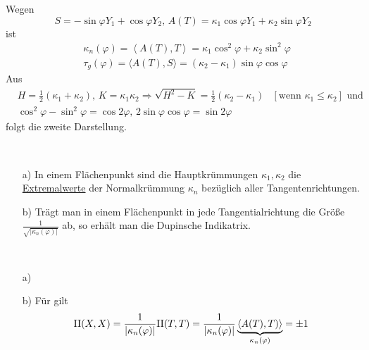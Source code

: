 \begin{beweis}
 Wegen
 \[
  S = - \sin \varphi Y_1 + \cos \varphi Y_2, \, A(T) = \kappa_1 \cos \varphi Y_1 + \kappa_2 \sin \varphi Y_2
 \]
 ist
 \begin{align*}
  &\kappa_n(\varphi) = \left\langle A(T), T \right\rangle = \kappa_1 \cos^2 \varphi + \kappa_2 \sin^2 \varphi \\
  &\tau_g(\varphi) = \langle A(T), S \rangle = (\kappa_2 - \kappa_1) \sin \varphi \cos \varphi
 \end{align*}
 Aus 
 \begin{align*}
  &H = \frac12 (\kappa_1 + \kappa_2), \, K = \kappa_1 \kappa_2 \Rightarrow \sqrt{H^2 - K} = \frac12 (\kappa_2 - \kappa_1) &[\text{wenn }\kappa_1 \le \kappa_2] \text{ und} \\
  & \cos^2 \varphi - \sin^2 \varphi = \cos 2\varphi, \, 2 \sin \varphi \cos \varphi = \sin 2 \varphi
 \end{align*}
 folgt die zweite Darstellung.
\end{beweis}

\begin{folgerung} \(\)
 \begin{enumerate}
  \item[a)] In einem Flächenpunkt sind die Hauptkrümmungen \(\kappa_1, \kappa_2\) die \uline{Extremalwerte} der Normalkrümmung \(\kappa_n\) bezüglich aller Tangentenrichtungen.
  \item[b)] Trägt man in einem Flächenpunkt in jede Tangentialrichtung die Größe \(\frac{1}{\sqrt{|\kappa_n(\varphi)|}}\) ab, so erhält man die Dupinsche Indikatrix.
 \end{enumerate}
\end{folgerung}

\begin{beweis} \(\)
 \begin{enumerate}
  \item[a)] 
  \item[b)] Für  gilt
  \[
   \Rom2(X,X) = \frac{1}{| \kappa_n(\varphi)|} \Rom2(T,T) = \frac{1}{|\kappa_n(\varphi)|} \underbrace{\langle A(T), T) \rangle}_{\kappa_n(\varphi)} = \pm 1
  \]
 \end{enumerate}

\end{beweis}

